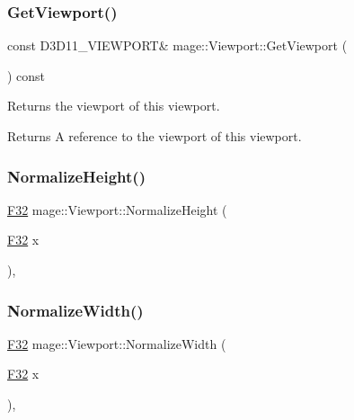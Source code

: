 \hypertarget{structmage_1_1_viewport_ad4bb75cdfbd137182898caad913de4d1}{}\label{structmage_1_1_viewport_ad4bb75cdfbd137182898caad913de4d1} 
\subsubsection{\texorpdfstring{Get\+Viewport()}{GetViewport()}}
{\footnotesize\ttfamily const D3\+D11\+\_\+\+V\+I\+E\+W\+P\+O\+RT\& mage\+::\+Viewport\+::\+Get\+Viewport (\begin{DoxyParamCaption}{ }\end{DoxyParamCaption}) const\hspace{0.3cm}{\ttfamily [noexcept]}}

Returns the viewport of this viewport.

\begin{DoxyReturn}{Returns}
A reference to the viewport of this viewport. 
\end{DoxyReturn}
\hypertarget{structmage_1_1_viewport_a7e8becd79a69371d7f6d513c88b04a5a}{}\label{structmage_1_1_viewport_a7e8becd79a69371d7f6d513c88b04a5a} 
\subsubsection{\texorpdfstring{Normalize\+Height()}{NormalizeHeight()}}
{\footnotesize\ttfamily \hyperlink{namespacemage_aa97e833b45f06d60a0a9c4fc22ae02c0}{F32} mage\+::\+Viewport\+::\+Normalize\+Height (\begin{DoxyParamCaption}\item[{\hyperlink{namespacemage_aa97e833b45f06d60a0a9c4fc22ae02c0}{F32}}]{x }\end{DoxyParamCaption})\hspace{0.3cm}{\ttfamily [static]}, {\ttfamily [noexcept]}}

\hypertarget{structmage_1_1_viewport_a2c00b7da56962f96830fd7626ef85d04}{}\label{structmage_1_1_viewport_a2c00b7da56962f96830fd7626ef85d04} 
\subsubsection{\texorpdfstring{Normalize\+Width()}{NormalizeWidth()}}
{\footnotesize\ttfamily \hyperlink{namespacemage_aa97e833b45f06d60a0a9c4fc22ae02c0}{F32} mage\+::\+Viewport\+::\+Normalize\+Width (\begin{DoxyParamCaption}\item[{\hyperlink{namespacemage_aa97e833b45f06d60a0a9c4fc22ae02c0}{F32}}]{x }\end{DoxyParamCaption})\hspace{0.3cm}{\ttfamily [static]}, {\ttfamily [noexcept]}}

